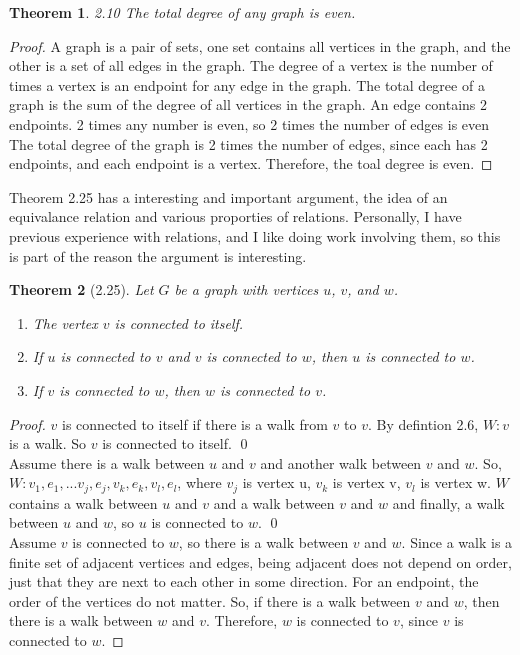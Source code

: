 \documentclass{article}
\newtheorem*{thm}{Theorem}
\begin{document}
\begin{description}
		\begin{thm}2.10     The total degree of any graph is even.\end{thm}
 		 \begin{proof}  A graph is a pair of sets, one set contains all vertices in the graph, and the other is a set of all edges in the graph.
       				The degree of a vertex is the number of times a vertex is an endpoint for any edge in the graph. 
				The total degree of a graph is the sum of the degree of all vertices in the graph. 
				An edge contains 2 endpoints. 
				2 times any number is even, so 2 times the number of edges is even 
				The total degree of the graph is 2 times the number of edges, since each has 2 endpoints, and each endpoint is a vertex. 
       				Therefore, the toal degree is even.  \end{proof}

		Theorem 2.25 has a interesting and important argument, the idea of an equivalance relation and various proporties of relations.	
		Personally, I have previous experience with relations, and I like doing work involving them, so this is part of the reason the argument
		is interesting. 

		\begin{thm}[2.25]
		          Let $G$ be a graph with vertices $u$, $v$, and $w$.
        	  \begin{enumerate}
        	    \item The vertex $v$ is connected to itself.
       		    \item If $u$ is connected to $v$ and $v$ is connected to $w$, then $u$ is connected to $w$.
        	    \item If $v$ is connected to $w$, then $w$ is connected to $v$.
         	 \end{enumerate}
 		 \end{thm}
 		  \begin{proof}
        		$v$ is connected to itself if there is a walk from $v$ to $v$. By defintion 2.6, $W: v$ is a walk. So $v$ is connected to itself. \qed
         		 \\
         		Assume there is a walk between $u$ and $v$ and another walk between $v$ and $w$. 
			So, $W: v_1, e_1, ... v_j, e_j, v_k, e_k, v_l, e_l$, where $v_j$     is vertex u, 
			$v_k$ is vertex v, $v_l$ is vertex w. $W$ contains a walk between $u$ and $v$ and a 
			walk between $v$ and $w$ and finally, a walk between $u    $ and $w$,  so $u$ is connected to $w$. \qed
         		 \\
         		Assume $v$ is connected to $w$, so there is a walk between $v$ and $w$. 
			Since a walk is a finite set of adjacent vertices and edges, being adjacent does not depend on order, 
			just that they are next to each other in some direction. For an endpoint, the order of the vertices do not matter.
			So, if there is a walk between $v$ and $w$, then there is a walk between $w$ and $v$. Therefore, $w$ is connected to $v$, 
			since $v$ is connected to $w$.
 		\end{proof}
	

\end{description}
\end{document}
